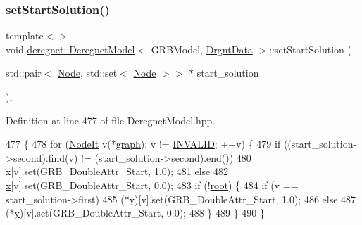 \subsubsection{\texorpdfstring{set\+Start\+Solution()}{setStartSolution()}\hspace{0.1cm}{\footnotesize\ttfamily [2/3]}}
{\footnotesize\ttfamily template$<$$>$ \\
void \hyperlink{classderegnet_1_1DeregnetModel}{deregnet\+::\+Deregnet\+Model}$<$ G\+R\+B\+Model, \hyperlink{classderegnet_1_1DrgntData}{Drgnt\+Data} $>$\+::set\+Start\+Solution (\begin{DoxyParamCaption}\item[{std\+::pair$<$ \hyperlink{namespacederegnet_a744bad34f2de9856d36715a445f027f3}{Node}, std\+::set$<$ \hyperlink{namespacederegnet_a744bad34f2de9856d36715a445f027f3}{Node} $>$$>$ $\ast$}]{start\+\_\+solution }\end{DoxyParamCaption})\hspace{0.3cm}{\ttfamily [inline]}, {\ttfamily [private]}}



Definition at line 477 of file Deregnet\+Model.\+hpp.


\begin{DoxyCode}
477                                                                                                      \{
478     \textcolor{keywordflow}{for} (\hyperlink{namespacederegnet_ac34314e1b5f456fc6d1bb9d96316de4a}{NodeIt} v(*\hyperlink{classderegnet_1_1DeregnetModel_a3cd2f54b8e061ef5bed32708d9bc1ef1}{graph}); v != \hyperlink{usinglemon_8hpp_adf770fe2eec438e3758ffe905dbae208}{INVALID}; ++v) \{
479         \textcolor{keywordflow}{if} ((start\_solution->second).find(v) != (start\_solution->second).end())
480             \hyperlink{classderegnet_1_1DeregnetModel_a360c980f3fec4dfbab50e9bb06a933a8}{x}[v].\textcolor{keyword}{set}(GRB\_DoubleAttr\_Start, 1.0);
481         \textcolor{keywordflow}{else}
482             \hyperlink{classderegnet_1_1DeregnetModel_a360c980f3fec4dfbab50e9bb06a933a8}{x}[v].set(GRB\_DoubleAttr\_Start, 0.0);
483         \textcolor{keywordflow}{if} (!\hyperlink{classderegnet_1_1DeregnetModel_a54b20393a0e26d65935d387685d7fe96}{root}) \{
484             \textcolor{keywordflow}{if} (v == start\_solution->first)
485                 (*y)[v].set(GRB\_DoubleAttr\_Start, 1.0);
486             \textcolor{keywordflow}{else}
487                 (*\hyperlink{classderegnet_1_1DeregnetModel_ae76df61afe302b939165facf3dd21ac8}{y})[v].set(GRB\_DoubleAttr\_Start, 0.0);
488         \}
489     \}
490 \}
\end{DoxyCode}
\mbox{\label{classderegnet_1_1DeregnetModel_acb0700e2cc2af475bc99255027e4757a}} 
